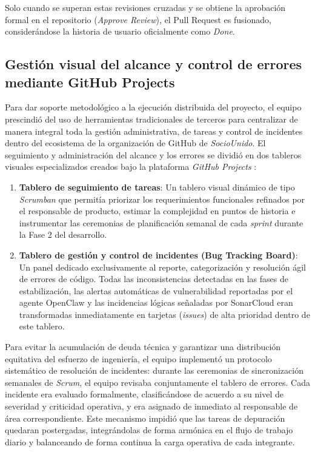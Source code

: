 Solo cuando se superan estas revisiones cruzadas y se obtiene la aprobación formal en el repositorio (\textit{Approve Review}), el Pull Request es fusionado, considerándose la historia de usuario oficialmente como \textit{Done}.

\subsection{Gestión visual del alcance y control de errores mediante GitHub Projects}

Para dar soporte metodológico a la ejecución distribuida del proyecto, el equipo prescindió del uso de herramientas tradicionales de terceros para centralizar de manera integral toda la gestión administrativa, de tareas y control de incidentes dentro del ecosistema de la organización de GitHub de \textit{SocioUnido}. El seguimiento y administración del alcance y los errores se dividió en dos tableros visuales especializados creados bajo la plataforma \textit{GitHub Projects} :

\begin{enumerate}
    \item \textbf{Tablero de seguimiento de tareas}: Un tablero visual dinámico de tipo \textit{Scrumban} que permitía priorizar los requerimientos funcionales refinados por el responsable de producto, estimar la complejidad en puntos de historia e instrumentar las ceremonias de planificación semanal de cada \textit{sprint} durante la Fase 2 del desarrollo.
    \item \textbf{Tablero de gestión y control de incidentes (Bug Tracking Board)}: Un panel dedicado exclusivamente al reporte, categorización y resolución ágil de errores de código. Todas las inconsistencias detectadas en las fases de estabilización, las alertas automáticas de vulnerabilidad reportadas por el agente OpenClaw y las incidencias lógicas señaladas por SonarCloud eran transformadas inmediatamente en tarjetas (\textit{issues}) de alta prioridad dentro de este tablero.
\end{enumerate}

Para evitar la acumulación de deuda técnica y garantizar una distribución equitativa del esfuerzo de ingeniería, el equipo implementó un protocolo sistemático de resolución de incidentes: durante las ceremonias de sincronización semanales de \textit{Scrum}, el equipo revisaba conjuntamente el tablero de errores. Cada incidente era evaluado formalmente, clasificándose de acuerdo a su nivel de severidad y criticidad operativa, y era asignado de inmediato al responsable de área correspondiente. Este mecanismo impidió que las tareas de depuración quedaran postergadas, integrándolas de forma armónica en el flujo de trabajo diario y balanceando de forma continua la carga operativa de cada integrante.

